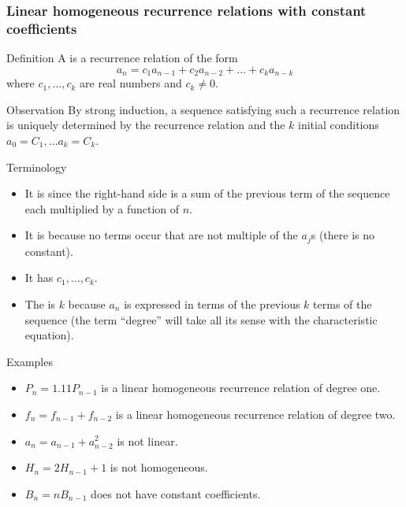 \documentclass[a4paper]{article}
\begin{document}
\subsubsection{Linear homogeneous recurrence relations with constant coefficients}
\begin{parag}{Definition}
    A  is a recurrence relation of the form 
    \[a_n = c_1 a_{n-1} + c_2 a_{n-2} + \ldots + c_k a_{n-k}\]
    where $c_1, \ldots, c_k$ are real numbers and $c_k \neq 0$.

    \begin{subparag}{Observation}
        By strong induction, a sequence satisfying such a recurrence relation is uniquely determined by the recurrence relation and the $k$ initial conditions $a_0 = C_1, \ldots a_k = C_k$.
    \end{subparag}

    \begin{subparag}{Terminology}
        \begin{itemize}[left=0pt]
            \item It is  since the right-hand side is a sum of the previous term of the sequence each multiplied by a function of $n$.
            \item It is  because no terms occur that are not multiple of the $a_j$s (there is no constant).
            \item It has  $c_1, \ldots, c_k$.
            \item The  is $k$ because $a_n$ is expressed in terms of the previous $k$ terms of the sequence (the term ``degree'' will take all its sense with the characteristic equation).
        \end{itemize}
    \end{subparag}
    
    \begin{subparag}{Examples}
        \begin{itemize}[left=0pt]
            \item $P_n = 1.11 P_{n-1}$ is a linear homogeneous recurrence relation of degree one.
            \item $f_n = f_{n-1} + f_{n-2}$ is a linear homogeneous recurrence relation of degree two.
            \item $a_n = a_{n-1} + a_{n-2}^2$ is not linear.
            \item $H_n = 2H_{n-1} + 1$ is not homogeneous.
            \item $B_n = nB_{n-1}$ does not have constant coefficients.
        \end{itemize}
    \end{subparag}
\end{parag}
\end{document}
